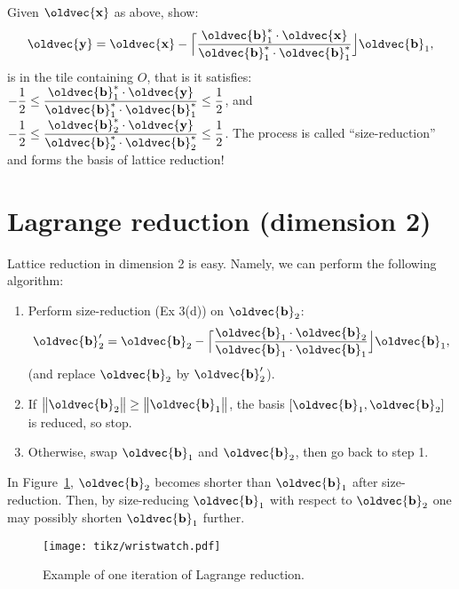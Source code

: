 \documentclass[10pt,a4paper]{article}
\renewcommand{\vec}[1]{\oldvec{\mathbf{#1}}}
\DeclarePairedDelimiter{\norm}{\big\lVert}{\big\rVert}
\begin{document}
\begin{enumerate}
		Given \(\vec{x}\) as above, show:
		\[
			\vec{y} = \vec{x} - \Big\lceil \frac{\vec{b}_1^* \cdot \vec{x}}{\vec{b}_1^* \cdot \vec{b}_1^*} \Big\rfloor \vec{b}_1,
		\]
		is in the tile containing \(O\), that is it satisfies:
		\(\displaystyle
			-\frac12 \leq \frac{\vec{b}_1^* \cdot \vec{y}}{\vec{b}_1^* \cdot \vec{b}_1^*} \leq \frac12
		\), and
		\(\displaystyle
			-\frac12 \leq \frac{\vec{b}_2^* \cdot \vec{y}}{\vec{b}_2^* \cdot \vec{b}_2^*} \leq \frac12
		\).
		The process is called ``size-reduction'' and forms the basis of lattice reduction!
\end{enumerate}

\clearpage
\section{Lagrange reduction (dimension 2)}
Lattice reduction in dimension 2 is easy.
Namely, we can perform the following algorithm:
\begin{enumerate}[itemsep=0mm,leftmargin=4em,label=\arabic*.]
	\item Perform size-reduction (Ex 3(d)) on \(\vec{b}_2\):
	\begin{equation}\label{eq:sr-d2}
		\vec{b}_2' = \vec{b}_2 - \Big\lceil \frac{\vec{b}_1 \cdot \vec{b}_2}{\vec{b}_1 \cdot \vec{b}_1} \Big\rfloor \vec{b}_1,
	\end{equation}
	(and replace \(\vec{b}_2\) by \(\vec{b}_2'\)).
	\item If \(\norm{\vec{b}_2} \geq \norm{\vec{b}_1}\), the basis \([\vec{b}_1, \vec{b}_2]\) is reduced, so stop.
	\item Otherwise, swap \(\vec{b}_1\) and \(\vec{b}_2\), then go back to step 1. %
\end{enumerate}

In Figure~\ref{fig:wristwatch}, \(\vec{b}_2\) becomes shorter than \(\vec{b}_1\) after size-reduction.
Then, by size-reducing \(\vec{b}_1\) with respect to \(\vec{b}_2\) one may possibly shorten \(\vec{b}_1\) further.

\begin{figure}[h!]
	\centering\texttt{[image: tikz/wristwatch.pdf]}
	\caption{Example of one iteration of Lagrange reduction.}\label{fig:wristwatch}
\end{figure}
\end{document}

